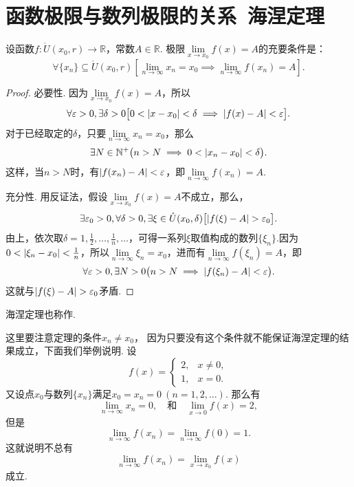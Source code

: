 \section{函数极限与数列极限的关系\ 海涅定理}
\begin{theorem}[海涅定理]\label{theorem:极限.海涅定理}
\def\Dx{\mathring{U}(x_0,r)}%
设函数\(f\colon \Dx\to\mathbb{R}\)，常数\(A\in\mathbb{R}\).
极限\(\lim\limits_{x \to x_0} f(x) = A\)的充要条件是：\[
\forall \{x_n\}\subseteq\Dx \left[
	\lim\limits_{n \to \infty} x_n = x_0
	\implies
	\lim\limits_{n \to \infty} f(x_n) = A
\right].
\]
\begin{proof}
必要性.
因为\(\lim\limits_{x \to x_0} f(x) = A\)，所以\[
\forall \varepsilon > 0, \exists \delta > 0 \bigl[
	0 < \abs{x - x_0} < \delta \implies \abs{f(x) - A} < \varepsilon
\bigr].
\]
对于已经取定的\(\delta\)，只要\(\lim\limits_{n \to \infty}x_n = x_0\)，那么\[
\exists N\in\mathbb{N}^+ \bigl(
	n > N \implies 0 < \abs{x_n - x_0} < \delta
\bigr).
\]这样，当\(n> N\)时，有\(\abs{f(x_n) - A} < \varepsilon\)，即\(\lim\limits_{n \to \infty} f(x_n) = A\).

充分性.
用反证法，假设\(\lim\limits_{x \to x_0} f(x) = A\)不成立，那么，\[
\exists \varepsilon_0 > 0, \forall \delta > 0, \exists \xi\in\mathring{U}(x_0,\delta) \bigl[
	\abs{f(\xi) - A} > \varepsilon_0
\bigr].
\]
由上，依次取\(\delta = 1,\frac{1}{2},\dotsc,\frac{1}{n},\dotsc\)，可得一系列\(\xi\)取值构成的数列\(\{\xi_n\}\).因为\(0 < \abs{\xi_n - x_0} < \frac{1}{n}\)，所以\(\lim\limits_{n \to \infty} \xi_n = x_0\)，进而有\(\lim\limits_{n \to \infty} f(\xi_n) = A\)，即\[
\forall \varepsilon > 0, \exists N > 0 \bigl(
	n > N \implies \abs{f(\xi_n) - A} < \varepsilon
\bigr).
\]这就与\(\abs{f(\xi) - A} > \varepsilon_0\)矛盾.
\end{proof}
\end{theorem}
海涅定理也称作.

这里要注意定理的条件\(x_n \neq x_0\)，
因为只要没有这个条件就不能保证海涅定理的结果成立，下面我们举例说明.
设\[
	f(x) = \left\{ \begin{array}{cl}
		2, & x\neq0, \\
		1, & x=0.
	\end{array} \right.
\]
又设点\(x_0\)与数列\(\{x_n\}\)满足\(x_0=x_n=0\ (n=1,2,\dotsc)\).
那么有\[
	\lim\limits_{n\to\infty} x_n = 0,
	\quad\text{和}\quad
	\lim\limits_{x\to0} f(x) = 2,
\]
但是\[
	\lim\limits_{n\to\infty} f(x_n) = \lim\limits_{n\to\infty} f(0) = 1.
\]这就说明不总有\[
	\lim\limits_{n\to\infty} f(x_n)
	= \lim\limits_{x \to x_0} f(x)
\]成立.

